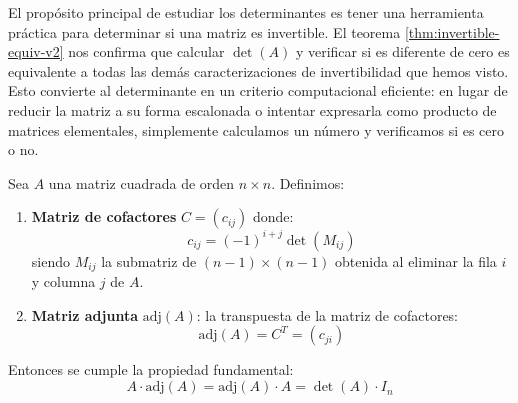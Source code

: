 \begin{rem}
El propósito principal de estudiar los determinantes es tener una herramienta práctica para determinar si una matriz es invertible. El teorema \ref{thm:invertible-equiv-v2} nos confirma que calcular $\det(A)$ y verificar si es diferente de cero es equivalente a todas las demás caracterizaciones de invertibilidad que hemos visto. Esto convierte al determinante en un criterio computacional eficiente: en lugar de reducir la matriz a su forma escalonada o intentar expresarla como producto de matrices elementales, simplemente calculamos un número y verificamos si es cero o no.
\end{rem}

\begin{theorem}\label{thm:adjunta}
Sea $A$ una matriz cuadrada de orden $n \times n$. Definimos:

\begin{enumerate}
    \item \textbf{Matriz de cofactores} $C = (c_{ij})$ donde: 
    \[
    c_{ij} = (-1)^{i+j} \det(M_{ij})
    \]
    siendo $M_{ij}$ la submatriz de $(n-1)\times(n-1)$ obtenida al eliminar la fila $i$ y columna $j$ de $A$.

    \item \textbf{Matriz adjunta} $\text{adj}(A)$: la transpuesta de la matriz de cofactores:
    \[
    \text{adj}(A) = C^T = (c_{ji})
    \]
\end{enumerate}

Entonces se cumple la propiedad fundamental:
\[
A \cdot \text{adj}(A) = \text{adj}(A) \cdot A = \det(A) \cdot I_n
\]
\end{theorem}

